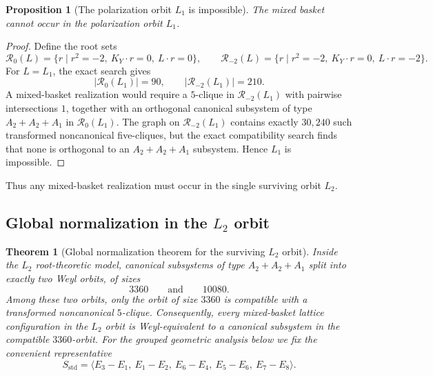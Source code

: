 \documentclass[11pt]{article}
\newtheorem{theorem}{Theorem}[section]
\newtheorem{proposition}[proposition]{Proposition}
\theoremstyle{definition}
\begin{document}
\begin{proposition}[The polarization orbit $L_1$ is impossible]\label{prop:L1-impossible}
The mixed basket cannot occur in the polarization orbit $L_1$.
\end{proposition}

\begin{proof}
Define the root sets
\[
\mathcal R_0(L)=\{r\mid r^2=-2,\ K_Y\cdot r=0,\ L\cdot r=0\},
\qquad
\mathcal R_{-2}(L)=\{r\mid r^2=-2,\ K_Y\cdot r=0,\ L\cdot r=-2\}.
\]
For $L=L_1$, the exact search gives
\[
|\mathcal R_0(L_1)|=90,
\qquad
|\mathcal R_{-2}(L_1)|=210.
\]
A mixed-basket realization would require a $5$-clique in $\mathcal R_{-2}(L_1)$ with pairwise intersections $1$, together with an orthogonal canonical subsystem of type $A_2+A_2+A_1$ in $\mathcal R_0(L_1)$. The graph on $\mathcal R_{-2}(L_1)$ contains exactly $30{,}240$ such transformed noncanonical five-cliques, but the exact compatibility search finds that none is orthogonal to an $A_2+A_2+A_1$ subsystem. Hence $L_1$ is impossible.
\end{proof}

Thus any mixed-basket realization must occur in the single surviving orbit $L_2$.

\subsection{Global normalization in the \texorpdfstring{$L_2$}{L2} orbit}

\begin{theorem}[Global normalization theorem for the surviving $L_2$ orbit]\label{thm:L2-global-normalization}
Inside the $L_2$ root-theoretic model, canonical subsystems of type $A_2+A_2+A_1$ split into exactly two Weyl orbits, of sizes
\[
3360\qquad\text{and}\qquad 10080.
\]
Among these two orbits, only the orbit of size $3360$ is compatible with a transformed noncanonical $5$-clique. Consequently, every mixed-basket lattice configuration in the $L_2$ orbit is Weyl-equivalent to a canonical subsystem in the compatible $3360$-orbit. For the grouped geometric analysis below we fix the convenient representative
\[
S_{\mathrm{std}}=\langle E_3-E_1,\ E_1-E_2,\ E_6-E_4,\ E_5-E_6,\ E_7-E_8\rangle.
\]
\end{theorem}
\end{document}
